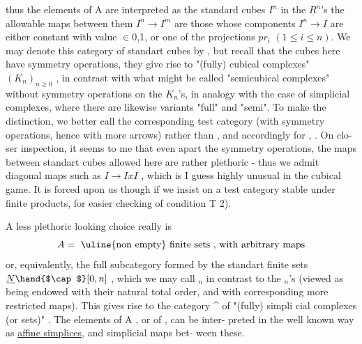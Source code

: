 thus the elements of A are interpreted as the standard cubes $I^n$ in the $\underline{R}^{n}$'s
the allowable maps between them $I^n \to I^m$ are those whose components $I^n \to I$
are either constant with value $\in$\hand{\{}0,1\hand{\}}, or one of the projections $pr_i$ \xout{(}
$(1 \leq i \leq n)$. We may denote this category of standart cubes by \hand{$\square$} , but
recall that  the cubes here have symmetry operations, they give
rise to  "(fully) cubical complexes" $(K_n)_{n \geq 0}$ , in contrast with what
might be called "semicubical complexes" without symmetry operations on the
$K_n$'s, in analogy with the case of simplicial complexes, where there are
likewise variants "full" and "semi". To make the distinction, we better
call the corresponding test category (with symmetry operations, hence
with more arrows) \hand{$\tilde{\square}$} rather than \hand{$\square$} , and accordingly for \hand{$\tilde{\Delta}$}, \hand{$\Delta$} . On clo-%
ser inspection, it seems to me that even apart the symmetry operations,
the maps between standart cubes allowed here are rather plethoric - thus
we admit diagonal maps such as $I \to IxI$ , which is I guess highly unusual
in the cubical game. It is forced upon us though if we insist on a test
category stable under finite products, for easier checking of condition
T 2).

A less plethoric looking choice really is
\[ A = \text{ \uline{non empty} finite sets , with arbitrary maps} \]
or, equivalently, the full subcategory \inserted{$\tilde{\Delta}$} formed by the standart finite sets
$\underline{N}\hand{$\cap$}[0,n]$ , which we may call \hand{$\tilde{\Delta}$}$_n$ in contrast to the  \hand{$\Delta$}$_n$'s (viewed as
being endowed with their natural total order, and with corresponding more
restricted maps). This gives rise to the category \hand{$\tilde{\Delta}$}\^{} of "(fully) simpli%
cial complexes (or sets)" . The elements of A , or of \hand{$\tilde{\Delta}$} , can be inter-%
preted in the well known way as \uline{affine simplices}, and simplicial maps bet-%
ween these.

